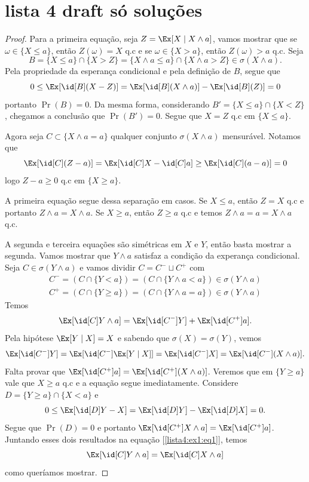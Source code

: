 \section{lista 4 draft só soluções}

\begin{exercise}[1.b]
\end{exercise}

\begin{proof}

	Para a primeira equação, seja $Z = \Ex[X \mid X \land a]$, vamos
	mostrar que se $\omega \in \{X \leq a\}$, então $Z(\omega) = X$ q.c e
	se $\omega \in \{X > a\}$, então $Z(\omega) > a$ q.c. Seja
	\[B = \{X \leq a\} \cap \{X > Z\} = \{X \land a \leq a\} \cap \{X
	\land a > Z\} \in \sigma(X \land a).\]
	Pela propriedade da esperança condicional e pela definição de $B$, segue que
	\[
		0 \leq \Ex[\id[B](X - Z)] = \Ex[\id[B](X \land a)] - \Ex[\id[B](Z)] = 0
	\]
	portanto $\Pr(B) = 0$. Da mesma forma, considerando $B' = \{X \leq
	a\} \cap \{X < Z\}$, chegamos a conclusão que $\Pr(B') = 0$. Segue
	que $X = Z$ q.c em $\{X \leq a\}$.

	Agora seja $C \subset \{X \land a = a\}$ qualquer conjunto $\sigma(X
	\land a)$ mensurável. Notamos que
	\[
		\Ex[\id[C](Z - a)] = \Ex[\id[C]X - \id[C]a] \geq \Ex[\id[C](a - a)] = 0
	\]
	logo $Z - a \geq 0$ q.c em $\{X \geq a\}$.

	A primeira equação segue dessa separação em casos. Se $X \leq a$,
	então $Z = X$ q.c e portanto $Z \land a = X \land a$. Se $X \geq a$,
	então $Z \geq a$ q.c
	e temos $Z \land a = a = X \land a$ q.c.

	A segunda e terceira equações são simétricas em $X$ e $Y$, então
	basta mostrar a segunda. Vamos mostrar que $Y \land a$ satisfaz a
	condição da experança condicional.
	Seja $C \in \sigma(Y \land a)$ e vamos dividir $C = C^- \sqcup C^+$ com
	\begin{align*}
		C^- = (C \cap \{Y < a\}) = (C \cap \{Y \land a < a\}) \in \sigma(Y \land a)\\
		C^+ = (C \cap \{Y \geq a\}) = (C \cap \{Y \land a = a\}) \in \sigma(Y \land a)
	\end{align*}
	Temos
	\begin{equation}
		\label{lista4:ex1:eq1}
		\Ex[\id[C] Y \land a] = \Ex[\id[C^-]Y] + \Ex[\id[C^+] a].
	\end{equation}
	Pela hipótese $\Ex[Y \mid X] = X$ e sabendo que $\sigma(X) = \sigma(Y)$, vemos
	\[
		\Ex[\id[C^-]Y] = \Ex[ \id[C^-]\Ex[Y \mid X]] = \Ex[\id[C^-]X] =
		\Ex[\id[C^-](X \land a)].
	\]
	Falta provar que $\Ex[\id[C^+]a] = \Ex[\id[C^+](X \land a)]$.
	Veremos que em $\{Y \geq a\}$ vale que $X \geq a$ q.c e a equação
	segue imediatamente.
	Considere $D = \{Y \geq a\} \cap \{X < a\}$ e
	\[
		0 \leq \Ex[\id[D]Y - X] = \Ex[\id[D]Y] - \Ex[\id[D]X] = 0.
	\]
	Segue que $\Pr(D) = 0$ e portanto
	$\Ex[\id[C^+]X \land a] = \Ex[\id[C^+]a]$. Juntando esses dois
	resultados na equação [\ref{lista4:ex1:eq1}], temos
	\[
		\Ex[\id[C] Y \land a] = \Ex[\id[C] X \land a]
	\]
	como queríamos mostrar.


\end{proof}
